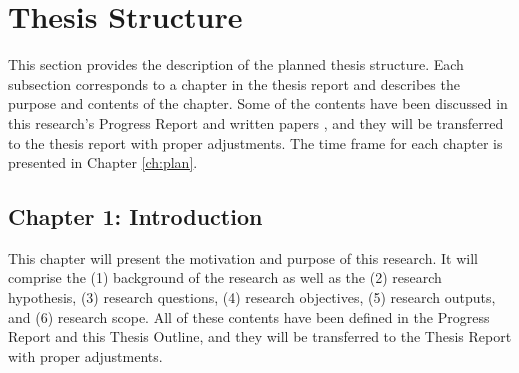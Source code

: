\documentclass[12pt, a4paper]{report} \usepackage[titletoc]{appendix}
\begin{document}

\chapter{Thesis Structure}
\label{sec:Thesis Structure}
This section provides the description of the planned thesis structure. Each subsection corresponds to a chapter in the thesis report and describes the purpose and contents of the chapter. Some of the contents have been discussed in this research's Progress Report \cite{yohannis2017progress} and written papers \cite{DBLP:conf/models/YohannisKP17,yohannis2018towards,yohannis2018hybrid}, and they will be transferred to the thesis report with proper adjustments. The time frame for each chapter is presented in Chapter \ref{ch:plan}.

\section{Chapter 1: Introduction}
\label{sec:chapter_1_introduction_plan}
This chapter will present the motivation and purpose of this research. It will comprise the (1) background of the research as well as the (2) research hypothesis, (3) research questions, (4) research objectives, (5) research outputs, and (6) research scope. All of these contents have been defined in the Progress Report \cite{yohannis2017progress} and  this Thesis Outline, and they will be transferred to the Thesis Report with proper adjustments. 
\end{document}
